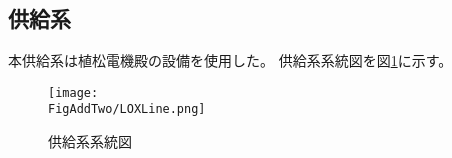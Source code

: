 \subsection{供給系}
本供給系は植松電機殿の設備を使用した。
供給系系統図を図\ref{fig:LOXLine}に示す。



\begin{figure}
\centering
\texttt{[image: \\FigAddTwo/LOXLine.png]}
\caption{供給系系統図}
\label{fig:LOXLine}
\end{figure}
